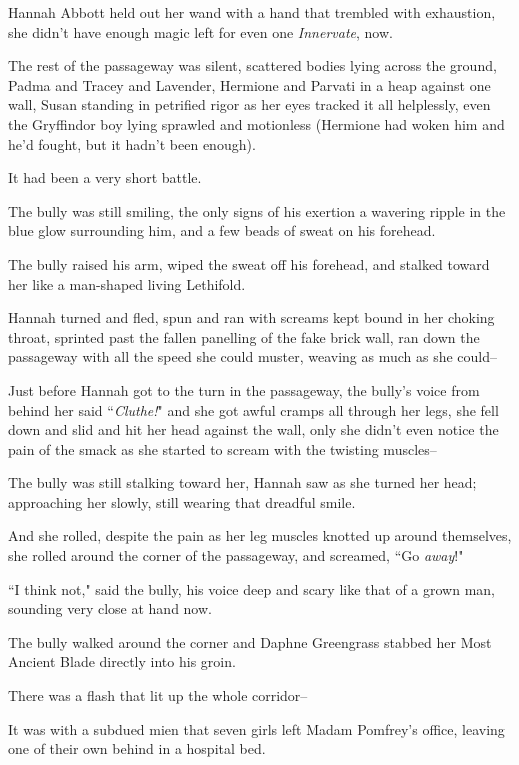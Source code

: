 \later

Hannah Abbott held out her wand with a hand that trembled with exhaustion, she didn't have enough magic left for even one \emph{Innervate}, now.

The rest of the passageway was silent, scattered bodies lying across the ground, Padma and Tracey and Lavender, Hermione and Parvati in a heap against one wall, Susan standing in petrified rigor as her eyes tracked it all helplessly, even the Gryffindor boy lying sprawled and motionless (Hermione had woken him and he'd fought, but it hadn't been enough).

It had been a very short battle.

The bully was still smiling, the only signs of his exertion a wavering ripple in the blue glow surrounding him, and a few beads of sweat on his forehead.

The bully raised his arm, wiped the sweat off his forehead, and stalked toward her like a man-shaped living Lethifold.

Hannah turned and fled, spun and ran with screams kept bound in her choking throat, sprinted past the fallen panelling of the fake brick wall, ran down the passageway with all the speed she could muster, weaving as much as she could\---

Just before Hannah got to the turn in the passageway, the bully's voice from behind her said ``\emph{Cluthe!}" and she got awful cramps all through her legs, she fell down and slid and hit her head against the wall, only she didn't even notice the pain of the smack as she started to scream with the twisting muscles\---

The bully was still stalking toward her, Hannah saw as she turned her head; approaching her slowly, still wearing that dreadful smile.

And she rolled, despite the pain as her leg muscles knotted up around themselves, she rolled around the corner of the passageway, and screamed, ``Go \emph{away}!"

``I think not," said the bully, his voice deep and scary like that of a grown man, sounding very close at hand now.

The bully walked around the corner and Daphne Greengrass stabbed her Most Ancient Blade directly into his groin.

There was a flash that lit up the whole corridor\---

\later

It was with a subdued mien that seven girls left Madam Pomfrey's office, leaving one of their own behind in a hospital bed.

